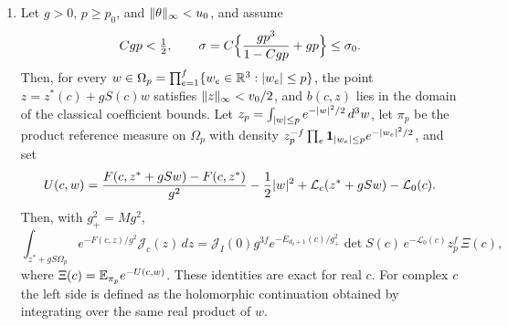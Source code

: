 \begin{lemma}
\begin{enumerate}
\item Let $g>0$, $p\ge p_0$, and $\lVert \theta\rVert_\infty<u_0$, and assume
\begin{equation}\label{ch09:eq:one-step-conditions}
 Cgp<\tfrac12,\qquad \sigma=C\Bigl\{\frac{gp^3}{1-Cgp}+gp\Bigr\}\le\sigma_0.
\end{equation}
Then, for every $w\in\Omega_p=\prod_{e=1}^f\{w_e\in\mathbb R^3:\lvert w_e\rvert\le p\}$, the point $z=z^*(c)+gS(c)w$ satisfies $\lVert z\rVert_\infty<v_0/2$, and $b(c,z)$ lies in the domain of the classical coefficient bounds. Let $z_p=\int_{\lvert w\rvert\le p}e^{-\lvert w\rvert^2/2}\,d^3w$, let $\pi_p$ be the product reference measure on $\Omega_p$ with density $z_p^{-f}\prod_e\mathbf 1_{\lvert w_e\rvert\le p}e^{-\lvert w_e\rvert^2/2}$, and set
\begin{equation}\label{ch09:eq:one-step-interaction}
 U(c,w)=\frac{F(c,z^*+gSw)-F(c,z^*)}{g^2}-\frac12\lvert w\rvert^2+\mathcal L_c(z^*+gSw)-\mathcal L_0(c).
\end{equation}
Then, with $g_+^2=Mg^2$,
\begin{equation}\label{ch09:eq:one-step-integral}
 \int_{z^*+gS\Omega_p}e^{-F(c,z)/g^2}\mathcal J_c(z)\,dz
 =\mathcal J_I(0)g^{3f}e^{-E_{d_0+1}(c)/g_+^2}\det S(c)\,e^{-\mathcal L_0(c)}z_p^f\,\Xi(c),
\end{equation}
where $\Xi(c)=\mathbb E_{\pi_p}e^{-U(c,w)}$.
These identities are exact for real $c$. For complex $c$ the left side is defined as the holomorphic continuation obtained by integrating over the same real product of $w$.
\end{enumerate}
\end{lemma}

